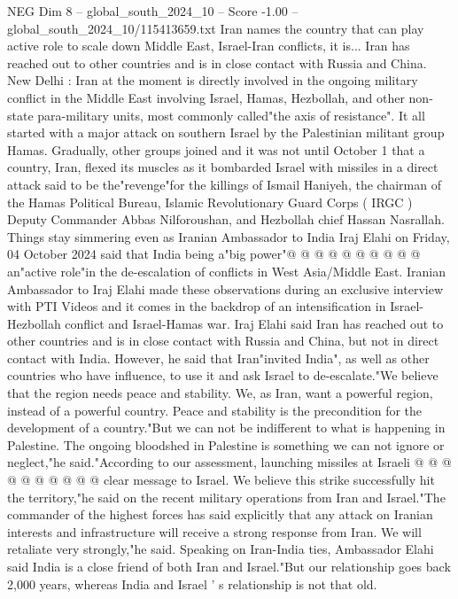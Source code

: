 \begin{textsample}{NEG Dim 8 – global\_south\_2024\_10 – Score -1.00 – global\_south\_2024\_10/115413659.txt}  \label{ex:f8_neg_193}
Iran names the country that can play active role to scale down Middle East, Israel-Iran conflicts, it is...
Iran has reached out to other countries and is in close contact with Russia and China.
New Delhi : Iran at the moment is directly involved in the ongoing military conflict in the Middle East involving Israel, Hamas, Hezbollah, and other non-state para-military units, most commonly called"the axis of resistance".
It all started with a major attack on southern Israel by the Palestinian militant group Hamas.
Gradually, other groups joined and it was not until October 1 that a country, Iran, flexed its muscles as it bombarded Israel with missiles in a direct attack said to be the"revenge"for the killings of Ismail Haniyeh, the chairman of the Hamas Political Bureau, Islamic Revolutionary Guard Corps ( IRGC ) Deputy Commander Abbas Nilforoushan, and Hezbollah chief Hassan Nasrallah.
Things stay simmering even as Iranian Ambassador to India Iraj Elahi on Friday, 04 October 2024 said that India being a"big power"@ @ @ @ @ @ @ @ @ @ an"active role"in the de-escalation of conflicts in West Asia/Middle East.
Iranian Ambassador to Iraj Elahi made these observations during an exclusive interview with PTI Videos and it comes in the backdrop of an intensification in Israel-Hezbollah conflict and Israel-Hamas war.
Iraj Elahi said Iran has reached out to other countries and is in close contact with Russia and China, but not in direct contact with India.
However, he said that Iran"invited India", as well as other countries who have influence, to use it and ask Israel to de-escalate."We believe that the region needs peace and stability.
We, as Iran, want a powerful region, instead of a powerful country.
Peace and stability is the precondition for the development of a country."But we can not be indifferent to what is happening in Palestine.
The ongoing bloodshed in Palestine is something we can not ignore or neglect,"he said."According to our assessment, launching missiles at Israeli @ @ @ @ @ @ @ @ @ @ clear message to Israel.
We believe this strike successfully hit the territory,"he said on the recent military operations from Iran and Israel."The commander of the highest forces has said explicitly that any attack on Iranian interests and infrastructure will receive a strong response from Iran.
We will retaliate very strongly,"he said.
Speaking on Iran-India ties, Ambassador Elahi said India is a close friend of both Iran and Israel."But our relationship goes back 2,000 years, whereas India and Israel ' s relationship is not that old.

\end{textsample}
